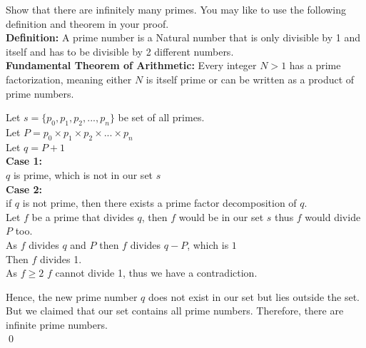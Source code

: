 \documentclass[12pt]{exam}
\begin{document}
\begin{questions}
    \question Show that there are infinitely many primes. You may like to use the following definition and theorem in your proof.
    \\ \textbf{Definition:} A prime number is a Natural number that is only divisible by 1 and itself and has to be divisible by 2 different numbers.
    \\\textbf{Fundamental Theorem of Arithmetic:} Every integer $N > 1$ has a prime factorization, meaning either $N$ is itself prime or can be written as a product of prime numbers.
    \begin{solution}
        Let $s=\{p_0,p_1,p_2,...,p_n\}$ be set of all primes. 
        \\Let $P = p_0 \times p_1 \times p_2 \times ... \times p_n$
        \\Let $q = P+1$
        \\\textbf{Case 1:}
        \\$q$ is prime, which is not in our set $s$
        \\\textbf{Case 2:} 
        \\if $q$ is not prime, then there exists a prime factor decomposition of $q$.
        \\Let $f$ be a prime that divides $q$, then $f$ would be in our set $s$ thus $f$ would divide $P$ too. 
        \\As $f$ divides $q$ and $P$ then $f$ divides $q-P$, which is $1$
        \\Then $f$ divides 1.
        \\As $f\geq2$ $f$ cannot divide 1, thus we have a contradiction.

        Hence, the new prime number $q$ does not exist in our set but lies outside the set. But we claimed that our set contains all prime numbers. Therefore, there are infinite prime numbers.
        \\\qed
    \end{solution}


\end{questions}
\end{document}
